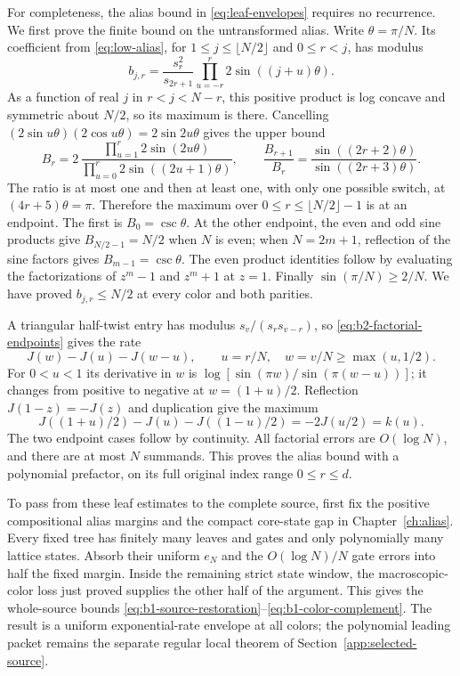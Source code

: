 For completeness, the alias bound in \eqref{eq:leaf-envelopes}
requires no recurrence. We first prove the finite bound on the
untransformed alias. Write $\theta=\pi/N$. Its coefficient from
\eqref{eq:low-alias}, for $1\le j\le\lfloor N/2\rfloor$ and
$0\le r<j$, has modulus
\[
 b_{j,r}=\frac{s_r^2}{s_{2r+1}}
           \prod_{u=-r}^{r}2\sin((j+u)\theta).
\]
As a function of real $j$ in $r<j<N-r$, this positive product is
log concave and symmetric about $N/2$, so its maximum is there.
Cancelling $(2\sin u\theta)(2\cos u\theta)=2\sin2u\theta$
gives the upper bound
\[
 B_r=2\,
 \frac{\prod_{u=1}^{r}2\sin(2u\theta)}
      {\prod_{u=0}^{r}2\sin((2u+1)\theta)},\qquad
 \frac{B_{r+1}}{B_r}
    =\frac{\sin((2r+2)\theta)}{\sin((2r+3)\theta)}.
\]
The ratio is at most one and then at least one, with only one
possible switch, at $(4r+5)\theta=\pi$. Therefore the maximum
over $0\le r\le\lfloor N/2\rfloor-1$ is at an endpoint.
The first is $B_0=\csc\theta$. At the other endpoint, the even
and odd sine products give $B_{N/2-1}=N/2$ when $N$ is even;
when $N=2m+1$, reflection of the sine factors gives
$B_{m-1}=\csc\theta$. The even product identities follow by
evaluating the factorizations of $z^m-1$ and $z^m+1$ at $z=1$.
Finally $\sin(\pi/N)\ge2/N$. We have proved
$b_{j,r}\le N/2$ at every color and both parities.

A triangular half-twist entry has modulus
$s_v/(s_rs_{v-r})$, so \eqref{eq:b2-factorial-endpoints} gives
the rate
\[
 J(w)-J(u)-J(w-u),\qquad u=r/N,\quad w=v/N\ge\max(u,1/2).
\]
For $0<u<1$ its derivative in $w$ is
$\log[\sin(\pi w)/\sin(\pi(w-u))]$; it changes from positive to
negative at $w=(1+u)/2$. Reflection
$J(1-z)=-J(z)$ and duplication give the maximum
\[
 J((1+u)/2)-J(u)-J((1-u)/2)=-2J(u/2)=k(u).
\]
The two endpoint cases follow by continuity. All factorial errors
are $O(\log N)$, and there are at most $N$ summands. This proves
the alias bound with a polynomial prefactor, on its full original
index range $0\le r\le d$.

To pass from these leaf estimates to the complete source, first fix
the positive compositional alias margins and the compact core-state
gap in Chapter~\ref{ch:alias}. Every fixed tree has finitely many
leaves and gates and only polynomially many lattice states. Absorb
their uniform $e_N$ and the $O(\log N)/N$ gate errors into half the
fixed margin. Inside the remaining strict state window, the
macroscopic-color loss just proved supplies the other half of the
argument. This gives the whole-source bounds
\eqref{eq:b1-source-restoration}--\eqref{eq:b1-color-complement}.
The result is a uniform exponential-rate envelope at all colors;
the polynomial leading packet remains the separate regular local
theorem of Section~\ref{app:selected-source}.
